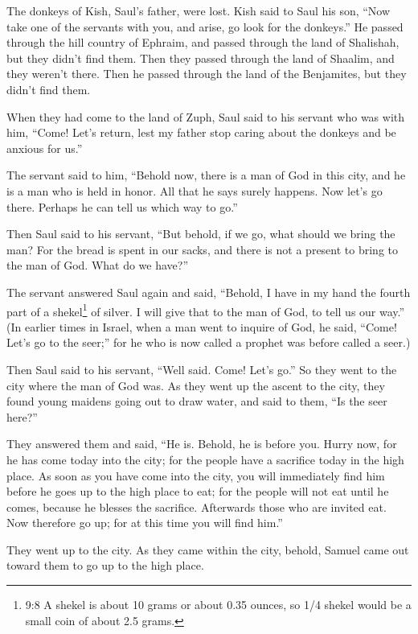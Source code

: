 \myverse{}The donkeys of Kish, Saul’s father, were lost. Kish said to Saul
his son, “Now take one of the servants with you, and arise, go look for the donkeys.”
\myverse{}He passed through the hill country of Ephraim, and passed through the land of
Shalishah, but they didn’t find them. Then they passed through the land of Shaalim, and they weren’t there.
Then he passed through the land of the Benjamites, but they didn’t find them.

\myverse{}When they had come to the land of Zuph, Saul said to his servant
who was with him, “Come! Let’s return, lest my father stop caring about the donkeys and be anxious for
us.”

\myverse{}The servant said to him, “Behold now, there is a man of God in
this city, and he is a man who is held in honor. All that he says surely happens. Now let’s go there.
Perhaps he can tell us which way to go.”

\myverse{}Then Saul said to his servant, “But behold, if we go, what should
we bring the man? For the bread is spent in our sacks, and there is not a present to bring to the man
of God. What do we have?”

\myverse{}The servant answered Saul again and said, “Behold, I have in my
hand the fourth part of a shekel\footnote{9:8 A shekel is about 10 grams or about 0.35 ounces, so 1/4 shekel would be a small coin of about
	2.5 grams.} of silver. I will give that to the man of God, to tell us our way.”
\myverse{}(In earlier times in Israel, when a man went to inquire of God, he said, “Come!
Let’s go to the seer;” for he who is now called a prophet was before called a seer.)

\myverse{}Then Saul said to his servant, “Well said. Come! Let’s go.” So
they went to the city where the man of God was.
\myverse{}As they went up the ascent to the city, they found young maidens going out
to draw water, and said to them, “Is the seer here?”

\myverse{}They answered them and said, “He is. Behold, he is before you.
Hurry now, for he has come today into the city; for the people have a sacrifice today in the high place.
\myverse{}As soon as you have come into the city, you will immediately find him before
he goes up to the high place to eat; for the people will not eat until he comes, because he blesses the
sacrifice. Afterwards those who are invited eat. Now therefore go up; for at this time you will find him.”

\myverse{}They went up to the city. As they came within the city, behold,
Samuel came out toward them to go up to the high place.

